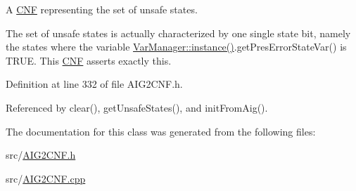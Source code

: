 A \hyperlink{classCNF}{C\-N\-F} representing the set of unsafe states. 

The set of unsafe states is actually characterized by one single state bit, namely the states where the variable \hyperlink{classVarManager_ac1a84b367c26dfc5ee9e612f7d61b288}{Var\-Manager\-::instance()}.get\-Pres\-Error\-State\-Var() is T\-R\-U\-E. This \hyperlink{classCNF}{C\-N\-F} asserts exactly this. 

Definition at line 332 of file A\-I\-G2\-C\-N\-F.\-h.



Referenced by clear(), get\-Unsafe\-States(), and init\-From\-Aig().



The documentation for this class was generated from the following files\-:\begin{DoxyCompactItemize}
\item 
src/\hyperlink{AIG2CNF_8h}{A\-I\-G2\-C\-N\-F.\-h}\item 
src/\hyperlink{AIG2CNF_8cpp}{A\-I\-G2\-C\-N\-F.\-cpp}\end{DoxyCompactItemize}
